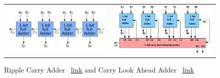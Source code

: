 \documentclass[12pt, a4paper]{article}
\begin{document}
	\begin{figure}[ht]
		\centering
		\begin{tabular}{ll}
			\includegraphics[width=7cm]{ripple.png}
			&
				\includegraphics[width=7cm]{look.png}
		\end{tabular}
		\caption{Ripple Carry Adder ~\href{https://upload.wikimedia.org/wikipedia/commons/thumb/5/5d/4-bit_ripple_carry_adder.svg/2000px-4-bit_ripple_carry_adder.svg.png}{link} \label{fig:ripple} and Carry Look Ahead Adder ~\href{http://sit.iitkgp.ernet.in/~coavl/images/carrylookahead.png}{link}}
	\end{figure}%
	
\end{document}
